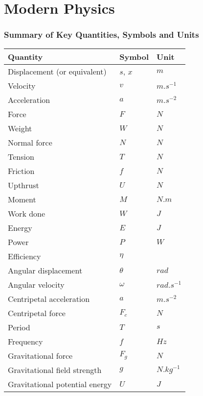\documentclass[12pt,a4 paper]{article}
\renewcommand*{\arraystretch}{1.5}
\begin{document}
\part{Modern Physics}





\section{Summary of Key Quantities, Symbols and Units}
\renewcommand*{\arraystretch}{1.4}
\begin{longtable}[H]{p{} p{} p{}}
\toprule
\textbf{Quantity} & \textbf{Symbol} & \textbf{Unit} \\
\midrule
\endhead
Displacement (or equivalent) & $s$, $x$ & $\unit{m}$ \\*
Velocity & $v$ & $\unit{m.s^{-1}}$ \\*
Acceleration & $a$ & $\unit{m.s^{-2}}$ \\*
\midrule
Force & $F$ & $\unit{N}$ \\*
Weight & $W$ & $\unit{N}$ \\*
Normal force & $N$ & $\unit{N}$ \\*
Tension & $T$ & $\unit{N}$ \\*
Friction & $f$ & $\unit{N}$ \\*
Upthrust & $U$ & $\unit{N}$ \\*
Moment & $M$ & $\unit{N.m}$ \\*
Work done & $W$ & $\unit{J}$ \\*
Energy & $E$ & $\unit{J}$ \\*
Power & $P$ & $\unit{W}$ \\*
Efficiency & $\eta$ & \\*
\midrule
Angular displacement & $\theta$ & $\unit{rad}$ \\*
Angular velocity & $\omega$ & $\unit{rad.s^{-1}}$ \\*
Centripetal acceleration & $a$ & $\unit{m.s^{-2}}$ \\*
Centripetal force & $F_c$ & $\unit{N}$ \\*
Period & $T$ & $\unit{s}$ \\*
Frequency & $f$ & $\unit{Hz}$ \\*
\midrule
Gravitational force & $F_g$ & $\unit{N}$ \\*
Gravitational field strength & $g$ & $\unit{N.kg^{-1}}$ \\*
Gravitational potential energy & $U$ & $\unit{J}$ \\*

\end{longtable}
\end{document}
